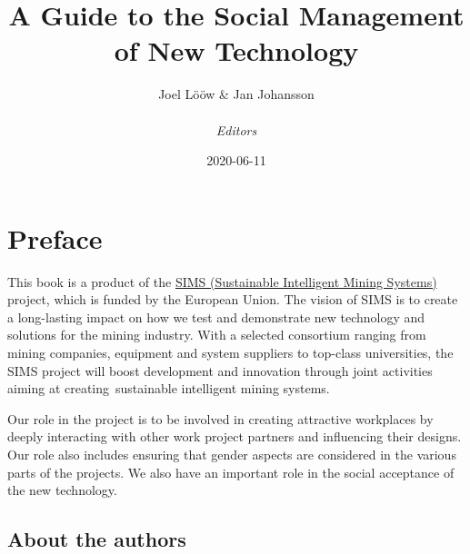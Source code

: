 \documentclass[
  12pt,
]{scrbook}
\title{A Guide to the Social Management of New Technology}
\author{Joel Lööw \& Jan Johansson\\
~\\
\emph{Editors}}
\date{2020-06-11}
\begin{document}
\maketitle

{
\setcounter{tocdepth}{0}
\tableofcontents
}
\hypertarget{preface}{%
\chapter*{Preface}\label{preface}}

This book is a product of the \href{http://simsmining.eu}{SIMS (Sustainable Intelligent Mining
Systems)} project, which is funded by the European
Union. The vision of SIMS is to create a long-lasting impact on how we
test and demonstrate new technology and solutions for the mining
industry. With a selected consortium ranging from mining companies,
equipment and system suppliers to top-class universities, the SIMS
project will boost development and innovation through joint activities
aiming at creating~sustainable intelligent mining systems.

Our role in the project is to be involved in creating attractive
workplaces by deeply interacting with other work project partners and
influencing their designs. Our role also includes ensuring that gender
aspects are considered in the various parts of the projects. We also
have an important role in the social acceptance of the new technology.

\hypertarget{about-the-authors}{%
\section*{About the authors}\label{about-the-authors}}
\end{document}
